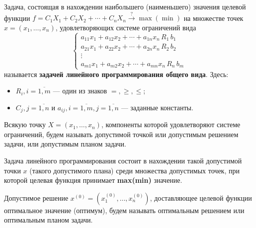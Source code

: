 \documentclass[17pt]{extarticle}
\begin{document}
\begin{definition}
    Задача, состоящая в нахождении наибольшего (наименьшего) значения целевой функции
    \(
    f = C_1 X_1 + C_2 X_2 + \cdots + C_n X_n \xrightarrow{?} \max(\min)
    \)
    на множестве точек \( x = (x_1, \ldots, x_n) \), удовлетворяющих системе ограничений вида
    \[
        \begin{cases}
            a_{11}x_1 + a_{12}x_2 + \cdots + a_{1n}x_n \, R_1 \, b_1 \\
            a_{21}x_1 + a_{22}x_2 + \cdots + a_{2n}x_n \, R_2 \, b_2 \\
            \vdots                                                   \\
            a_{m1}x_1 + a_{m2}x_2 + \cdots + a_{mn}x_n \, R_n \, b_m
        \end{cases}
    \]
    называется \textbf{задачей линейного программирования общего вида}.
    Здесь:
    \begin{itemize}
        \item \( R_i, i = \overline{1, m} \) — один из знаков \( =, \geq, \leq \);
        \item \( C_j, j = \overline{1, n} \) и \( a_{ij}, i = \overline{1, m}, j = \overline{1, n} \) — заданные константы.
    \end{itemize}
\end{definition}

\begin{definition}
    Всякую точку \( X = (x_1, \ldots, x_n) \), компоненты которой удовлетворяют системе ограничений,
    будем называть допустимой точкой или допустимым решением задачи, или допустимым планом задачи.
\end{definition}

Задача линейного программирования состоит в нахождении такой допустимой точки \( x \) (такого допустимого плана)
среди множества допустимых точек,
при которой целевая функция принимает \textbf{max(min)} значение.

\begin{definition}
    Допустимое решение \( x^{(0)} = (x_1^{(0)}, \ldots, x_n^{(0)}) \),
    доставляющее целевой функции оптимальное значение (оптимум),
    будем называть оптимальным решением или оптимальным планом задачи.
\end{definition}
\end{document}
